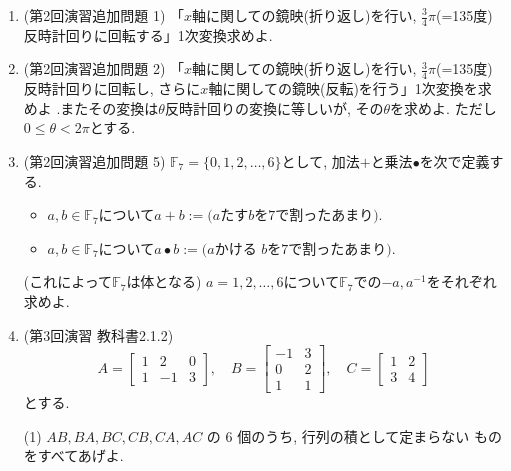 \documentclass[dvipdfmx,a4paper,11pt]{article} %
\theoremstyle{definition}
\begin{document}
\begin{enumerate}[label=\textbf{問題}\arabic*.]
\item(第2回演習追加問題 1) 「$x$軸に関しての鏡映(折り返し)を行い, $\frac{3}{4}\pi$(=135度)反時計回りに回転する」1次変換求めよ.
  \item(第2回演習追加問題 2) 「$x$軸に関しての鏡映(折り返し)を行い, $\frac{3}{4}\pi$(=135度)反時計回りに回転し, さらに$x$軸に関しての鏡映(反転)を行う」1次変換を求めよ .またその変換は$\theta$反時計回りの変換に等しいが, その$\theta$を求めよ. 
  ただし$0 \le \theta <2\pi$とする. 
\item (第2回演習追加問題 5) $\mathbb{F}_7=\{0,1 ,2, \ldots, 6\}$として, 
  加法$+ $と乗法$\bullet$を次で定義する.
  \begin{itemize}
  \item $a, b \in \mathbb{F}_7$について$a+b:=\text{($a$たす$b$を$7$で割ったあまり)}$. 
\item $a, b \in \mathbb{F}_7$について$a\bullet b:=\text{($a$かける $b$を$7$で割ったあまり)}$. 
 \end{itemize}
(これによって$\mathbb{F}_7$は体となる)
$a=1,2, \ldots, 6$について$\mathbb{F}_7$での$-a, a^{-1}$をそれぞれ求めよ.
\item (第3回演習 教科書2.1.2)
\[
A=
\begin{bmatrix}
1 & 2 & 0\\
1 & -1 & 3
\end{bmatrix},
\quad
B=
\begin{bmatrix}
-1 & 3\\
0 & 2\\
1 & 1
\end{bmatrix},
\quad
C=
\begin{bmatrix}
1 & 2\\
3 & 4
\end{bmatrix}
\]
とする.

(1) \(AB, BA, BC, CB, CA, AC\) の \(6\) 個のうち, 行列の積として定まらない
ものをすべてあげよ.


\end{enumerate}
\end{document}
